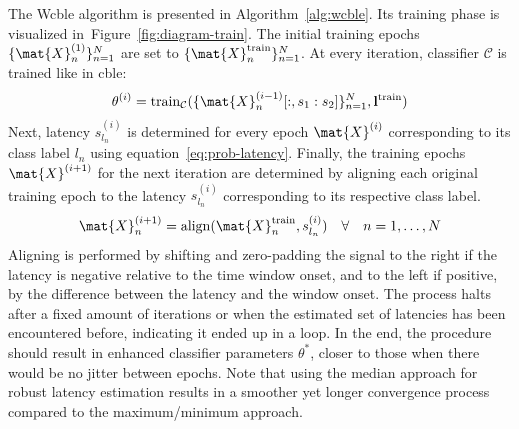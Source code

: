 The W\ac{cble} algorithm is presented in Algorithm~\ref{alg:wcble}.
Its training phase is visualized in~Figure~\ref{fig:diagram-train}.
The initial training epochs $\{\mat{X}_n^{(1)}\}_{n=1}^N$ are set to $\{\mat{X}_n^\mathrm{train}\}_{n=1}^N$.
At every iteration, classifier $\mathcal{C}$ is trained like in \ac{cble}:
\begin{equation}
  \theta^{(i)} =
  \mathrm{train}_\mathcal{C}(\{\mat{X}^{(i-1)}_n[:,s_1:s_2]\}_{n=1}^N,\mathbf{l}^\mathrm{train})
\end{equation}
Next, latency $s_{l_n}^{(i)}$ is determined for every epoch $\mat{X}^{(i)}$ corresponding
to its class label $l_n$ using equation~\ref{eq:prob-latency}.
Finally, the training epochs $\mat{X}^{(i+1)}$ for the next iteration are determined by aligning
each original training epoch to the latency $s_{l_n}^{(i)}$ corresponding to its respective class
label.
\begin{equation}
  \mat{X}^{(i+1)}_n = \mathrm{align}(\mat{X}_n^\mathrm{train}, s_{l_n}^{(i)}) \quad \forall \quad n=1,\ldots,N
\end{equation}
Aligning is performed by shifting and zero-padding the signal to the right if
the latency is negative relative to the time window onset, and to the left if
positive, by the difference between the latency and the window onset.
The process halts after a fixed amount of iterations or when the estimated set
of latencies has been encountered before, indicating it ended up in a loop.
In the end, the procedure should result in enhanced classifier parameters $\theta^*$,
closer to those when there would be no jitter between epochs.
Note that using the median approach for robust latency estimation results in a
smoother yet longer convergence process compared to the maximum/minimum approach.

